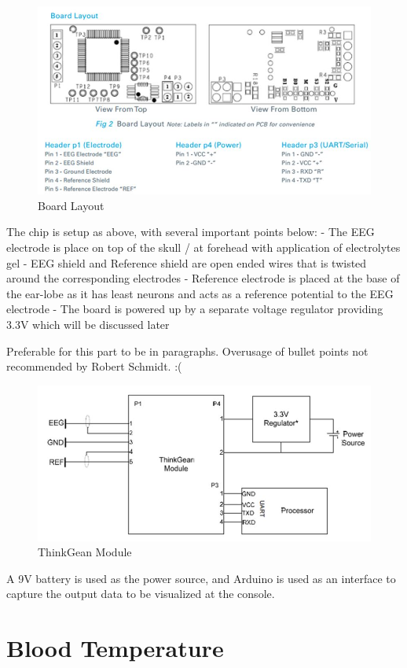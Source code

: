 \begin{figure}[H]
	\centering
	\includegraphics[width=0.8\linewidth]{jiahuipic3.jpg}
	\caption{Board Layout}
\end{figure}

The chip is setup as above, with several important points below:
-	The EEG electrode is place on top of the skull / at forehead with application of electrolytes gel
-	EEG shield and Reference shield are open ended wires that is twisted around the corresponding electrodes
-	Reference electrode is placed at the base of the ear-lobe as it has least neurons and acts as a reference potential to the EEG electrode
-	The board is powered up by a separate voltage regulator providing 3.3V which will be discussed later

Preferable for this part to be in paragraphs. Overusage of bullet points not recommended by Robert Schmidt. :( 

\begin{figure}[H]
	\centering
	\includegraphics[width=0.7\linewidth]{jiahuipic4.jpg}
	\caption{ThinkGean Module}
\end{figure}

A 9V battery is used as the power source, and Arduino is used as an interface to capture the output data to be visualized at the console. 

\section{Blood Temperature}


